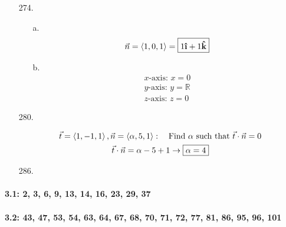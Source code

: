﻿\documentclass[10pt, letterpaper]{article}
\begin{document}
\begin{enumerate}
        \item [274.]\mbox{}
        \begin{mdframed}
            \begin{itemize}
                \item [a.]
                \begin{equation*}
                    \begin{gathered}
                        \vec{n} = \expval{1,0,1} = \boxed{1\ihat + 1\khat}
                    \end{gathered}
                \end{equation*}
                \item [b.]
                \begin{equation*}
                    \begin{gathered}
                        \text{$x$-axis: } \boxed{x = 0}          \\
                        \text{$y$-axis: } \boxed{y = \mathbb{R}} \\
                        \text{$z$-axis: } \boxed{z = 0}
                    \end{gathered}
                \end{equation*}      
            \end{itemize}
        \end{mdframed}

        \item [280.]\mbox{}
        \begin{mdframed}
            \begin{equation*}
                \begin{gathered}
                    \vec{t} = \expval{1,-1,1}, \vec{n} = \expval{\alpha, 5, 1}:
                    \quad \text{Find $\alpha$ such that } \vec{t} \cdot \vec{n} = 0 \\
                    \vec{t} \cdot \vec{n} = \alpha - 5 + 1 \rightarrow \boxed{\alpha = 4}
                \end{gathered}
            \end{equation*}
        \end{mdframed}

        \item [286.]\mbox{}
        \begin{mdframed}
            
        \end{mdframed}
    \end{enumerate}

    \pagebreak

    \paragraph*{3.1:   2, 3, 6, 9, 13, 14, 16, 23, 29, 37}

    \pagebreak

    \paragraph*{3.2:  43, 47, 53, 54, 63, 64, 67, 68, 70, 71, 72, 77, 81, 86, 95, 96, 101}
\end{document}
